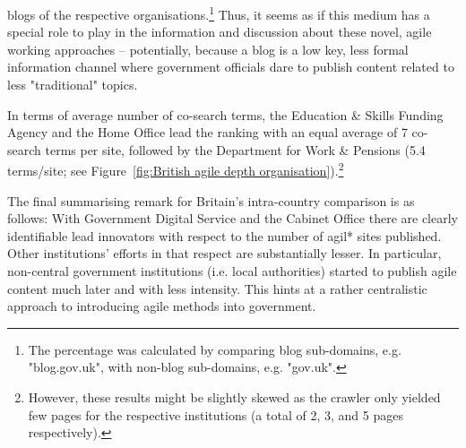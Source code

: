 \noindent blogs of the respective organisations.\footnote{The percentage was calculated by comparing blog sub-domains, e.g. "blog.gov.uk", with non-blog sub-domains, e.g. "gov.uk".} Thus, it seems as if this medium has a special role to play in the information and discussion about these novel, agile working approaches – potentially, because a blog is a low key, less formal information channel where government officials dare to publish content related to less "traditional" topics.

In terms of average number of co-search terms, the Education \& Skills Funding Agency and the Home Office lead the ranking with an equal average of 7 co-search terms per site, followed by the Department for Work \& Pensions (5.4 terms/site; see Figure~\ref{fig:British agile depth organisation}).\footnote{However, these results might be slightly skewed as the crawler only yielded few pages for the respective institutions (a total of 2, 3, and 5 pages respectively).} 

The final summarising remark for Britain's intra-country comparison is as follows: With Government Digital Service and the Cabinet Office there are clearly identifiable lead innovators with respect to the number of agil* sites published. Other institutions' efforts in that respect are substantially lesser. In particular, non-central government institutions (i.e. local authorities) started to publish agile content much later and with less intensity. This hints at a rather centralistic approach to introducing agile methods into government.
